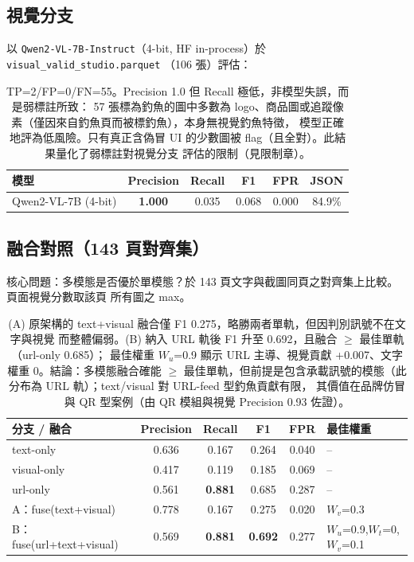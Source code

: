\documentclass[11pt]{ctexart}
\begin{document}
\subsection{視覺分支}
以 \texttt{Qwen2-VL-7B-Instruct}（4-bit, HF in-process）於 \texttt{visual\_valid\_studio.parquet}
（106 張）評估：
\begin{table}[h]
\centering
\begin{tabular}{lccccc}
\toprule
\textbf{模型} & \textbf{Precision} & \textbf{Recall} & \textbf{F1} & \textbf{FPR} & \textbf{JSON} \\
\midrule
Qwen2-VL-7B (4-bit) & \textbf{1.000} & 0.035 & 0.068 & 0.000 & 84.9\% \\
\bottomrule
\end{tabular}
\caption{TP=2/FP=0/FN=55。Precision 1.0 但 Recall 極低，非模型失誤，而是弱標註所致：
57 張標為釣魚的圖中多數為 logo、商品圖或追蹤像素（僅因來自釣魚頁而被標釣魚），本身無視覺釣魚特徵，
模型正確地評為低風險。只有真正含偽冒 UI 的少數圖被 flag（且全對）。此結果量化了弱標註對視覺分支
評估的限制（見限制章）。}
\end{table}

\subsection{融合對照（143 頁對齊集）}
核心問題：多模態是否優於單模態？於 143 頁文字與截圖同頁之對齊集上比較。頁面視覺分數取該頁
所有圖之 max。
\begin{table}[h]
\centering
\begin{tabular}{lccccl}
\toprule
\textbf{分支 / 融合} & \textbf{Precision} & \textbf{Recall} & \textbf{F1} & \textbf{FPR} & \textbf{最佳權重} \\
\midrule
text-only & 0.636 & 0.167 & 0.264 & 0.040 & -- \\
visual-only & 0.417 & 0.119 & 0.185 & 0.069 & -- \\
url-only & 0.561 & \textbf{0.881} & 0.685 & 0.287 & -- \\
\midrule
A：fuse(text+visual) & 0.778 & 0.167 & 0.275 & 0.020 & $W_v$=0.3 \\
B：fuse(url+text+visual) & 0.569 & \textbf{0.881} & \textbf{0.692} & 0.277 & $W_u$=0.9,$W_t$=0,$W_v$=0.1 \\
\bottomrule
\end{tabular}
\caption{(A) 原架構的 text+visual 融合僅 F1 0.275，略勝兩者單軌，但因判別訊號不在文字與視覺
而整體偏弱。(B) 納入 URL 軌後 F1 升至 0.692，且融合 $\ge$ 最佳單軌（url-only 0.685）；
最佳權重 $W_u$=0.9 顯示 URL 主導、視覺貢獻 +0.007、文字權重 0。結論：多模態融合確能 $\ge$
最佳單軌，但前提是包含承載訊號的模態（此分布為 URL 軌）；text/visual 對 URL-feed 型釣魚貢獻有限，
其價值在品牌仿冒與 QR 型案例（由 QR 模組與視覺 Precision 0.93 佐證）。}
\end{table}
\end{document}
